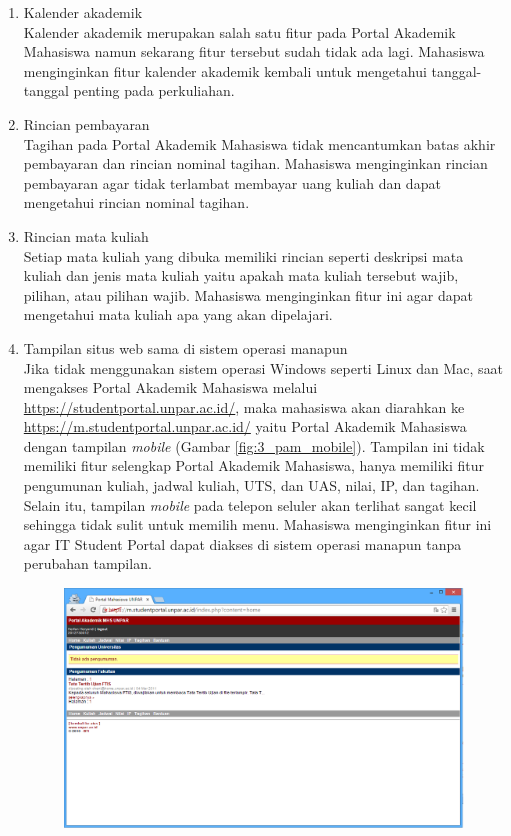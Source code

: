 \begin{enumerate}
	\item Kalender akademik\\
	Kalender akademik merupakan salah satu fitur pada Portal Akademik Mahasiswa namun sekarang fitur tersebut sudah tidak ada lagi. Mahasiswa menginginkan fitur kalender akademik kembali untuk mengetahui tanggal-tanggal penting pada perkuliahan. 
	\item Rincian pembayaran\\
	Tagihan pada Portal Akademik Mahasiswa tidak mencantumkan batas akhir pembayaran dan rincian nominal tagihan. Mahasiswa menginginkan rincian pembayaran agar tidak terlambat membayar uang kuliah dan dapat mengetahui rincian nominal tagihan.
	\item Rincian mata kuliah\\
	Setiap mata kuliah yang dibuka memiliki rincian seperti deskripsi mata kuliah dan jenis mata kuliah yaitu apakah mata kuliah tersebut wajib, pilihan, atau pilihan wajib. Mahasiswa menginginkan fitur ini agar dapat mengetahui mata kuliah apa yang akan dipelajari.
	\item Tampilan situs web sama di sistem operasi manapun\\
	Jika tidak menggunakan sistem operasi Windows seperti Linux dan Mac, saat mengakses Portal Akademik Mahasiswa melalui \url{https://studentportal.unpar.ac.id/}, maka mahasiswa akan diarahkan ke \url{https://m.studentportal.unpar.ac.id/} yaitu Portal Akademik Mahasiswa dengan tampilan \textit{mobile} (Gambar \ref{fig:3_pam_mobile}). Tampilan ini tidak memiliki fitur selengkap Portal Akademik Mahasiswa, hanya memiliki fitur pengumunan kuliah, jadwal kuliah, UTS, dan UAS, nilai, IP, dan tagihan. Selain itu, tampilan \textit{mobile} pada telepon seluler akan terlihat sangat kecil sehingga tidak sulit untuk memilih menu. Mahasiswa menginginkan fitur ini agar IT Student Portal dapat diakses di sistem operasi manapun tanpa perubahan tampilan.
	\begin{figure}[H]
			\centering
			\includegraphics[scale=0.5]{Gambar/pam-mobile}

\end{figure}
\end{enumerate}
